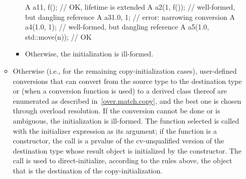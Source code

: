 \begin{itemize}
\begin{itemize}
\begin{itemize}
\begin{note}
\begin{example}
\begin{codeblock}
A a1{1, f()};                   // OK, lifetime is extended
A a2(1, f());                   // well-formed, but dangling reference
A a3{1.0, 1};                   // error: narrowing conversion
A a4(1.0, 1);                   // well-formed, but dangling reference
A a5(1.0, std::move(n));        // OK
\end{codeblock}
\end{example}
\end{note}
\item
Otherwise, the initialization is ill-formed.
\end{itemize}

\item
Otherwise (i.e., for the remaining copy-initialization cases),
user-defined conversions that can convert from the
source type to the destination type or (when a conversion function
is used) to a derived class thereof are enumerated as described in~\ref{over.match.copy},
and the best one is chosen through overload resolution.
If the conversion cannot be done or
is ambiguous, the initialization is ill-formed.  The function
selected is called with the initializer expression as its
argument; if the function is a constructor, the call is a prvalue
of the cv-unqualified version of the
destination type whose result object is initialized by the constructor.
The call is used
to direct-initialize, according to the rules above, the object
that is the destination of the copy-initialization.
\end{itemize}


\end{itemize}

